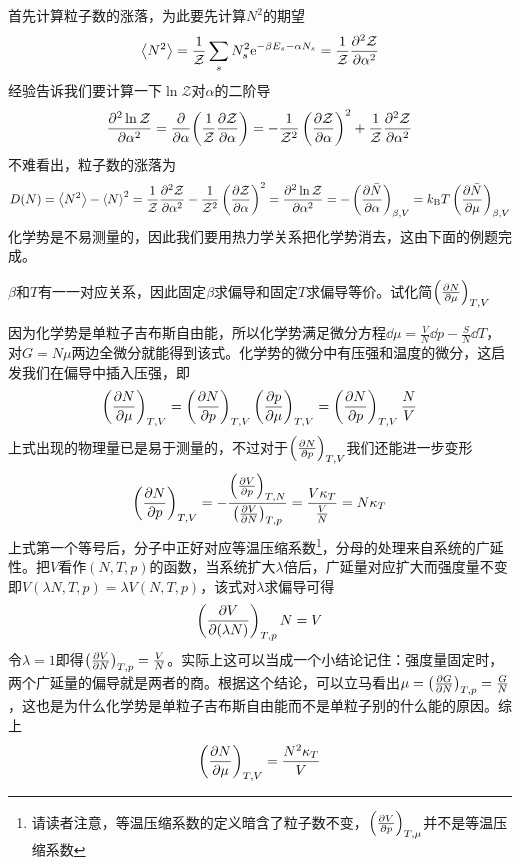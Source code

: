 \documentclass[../../main.tex]{subfiles}
\begin{document}
首先计算粒子数的涨落，为此要先计算\(N^2\)的期望
\begin{equation}
    \expval{N^2}=\frac{1}{\mathcal{Z}}\sum_s N_s^2\mathrm{e}^{-\beta E_s-\alpha N_s}=\frac{1}{\mathcal{Z}}\pdv[2]{\mathcal{Z}}{\alpha}
\end{equation}
经验告诉我们要计算一下\(\ln\mathcal{Z}\)对\(\alpha\)的二阶导
\begin{equation}
    \pdv[2]{\ln\mathcal{Z}}{\alpha}=\pdv{\alpha}(\frac{1}{\mathcal{Z}}\pdv{\mathcal{Z}}{\alpha})=-\frac{1}{\mathcal{Z}^2}\left(\pdv{\mathcal{Z}}{\alpha}\right)^2+\frac{1}{\mathcal{Z}}\pdv[2]{\mathcal{Z}}{\alpha}
\end{equation}
不难看出，粒子数的涨落为
\begin{equation}
    D(N)=\expval{N^2}-\expval{N}^2=\frac{1}{\mathcal{Z}}\pdv[2]{\mathcal{Z}}{\alpha}-\frac{1}{\mathcal{Z}^2}\left(\pdv{\mathcal{Z}}{\alpha}\right)^2=\pdv[2]{\ln\mathcal{Z}}{\alpha}=-\left(\pdv{\bar{N}}{\alpha}\right)_{\beta,V}=k_{\mathrm{B}} T\left(\pdv{\bar{N}}{\mu}\right)_{\beta,V}
\end{equation}
化学势是不易测量的，因此我们要用热力学关系把化学势消去，这由下面的例题完成。
\begin{example}
    \(\beta\)和\(T\)有一一对应关系，因此固定\(\beta\)求偏导和固定\(T\)求偏导等价。试化简\(\left(\pdv{N}{\mu}\right)_{T,V}\)
    \begin{solution}
        因为化学势是单粒子吉布斯自由能，所以化学势满足微分方程\(\dd\mu=\frac{V}{N}\dd p-\frac{S}{N}\dd T\)，对\(G=N\mu\)两边全微分就能得到该式。化学势的微分中有压强和温度的微分，这启发我们在偏导中插入压强，即
        \begin{equation}
            \left(\pdv{N}{\mu}\right)_{T,V}=\left(\pdv{N}{p}\right)_{T,V}\left(\pdv{p}{\mu}\right)_{T,V}=\left(\pdv{N}{p}\right)_{T,V}\frac{N}{V}
        \end{equation}
        上式出现的物理量已是易于测量的，不过对于\(\left(\pdv{N}{p}\right)_{T,V}\)我们还能进一步变形
        \begin{equation}
            \left(\pdv{N}{p}\right)_{T,V}=-\frac{\left(\pdv{V}{p}\right)_{T,N}}{\left(\pdv{V}{N}\right)_{T,p}}=\frac{V\kappa_T}{\frac{V}{N}}=N\kappa_T
        \end{equation}
        上式第一个等号后，分子中正好对应等温压缩系数\footnote{请读者注意，等温压缩系数的定义暗含了粒子数不变，\(\left(\pdv{V}{p}\right)_{T,\mu}\)并不是等温压缩系数}，分母的处理来自系统的广延性。把\(V\)看作\((N,T,p)\)的函数，当系统扩大\(\lambda\)倍后，广延量对应扩大而强度量不变即\(V(\lambda N,T,p)=\lambda V(N,T,p)\)，该式对\(\lambda\)求偏导可得
        \begin{equation}
            \left(\pdv{V}{(\lambda N)}\right)_{T,p}N=V
        \end{equation}
        令\(\lambda=1\)即得\(\left(\pdv{V}{N}\right)_{T,p}=\frac{V}{N}\)。实际上这可以当成一个小结论记住：强度量固定时，两个广延量的偏导就是两者的商。根据这个结论，可以立马看出\(\mu=\left(\pdv{G}{N}\right)_{T,p}=\frac{G}{N}\)，这也是为什么化学势是单粒子吉布斯自由能而不是单粒子别的什么能的原因。综上
        \begin{equation}
            \left(\pdv{N}{\mu}\right)_{T,V}=\frac{N^2\kappa_T}{V}
        \end{equation}
    \end{solution}
\end{example}
\end{document}
